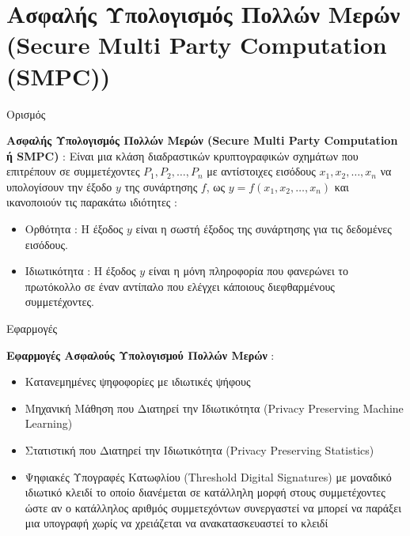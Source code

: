 \documentclass[10pt]{beamer}
\begin{document}
    \section{Ασφαλής Υπολογισμός Πολλών Μερών \\ (Secure Multi Party Computation (SMPC))}
    \begin{frame}{Ορισμός}
        \begin{block}{}
            \textbf{Ασφαλής Υπολογισμός Πολλών Μερών (Secure Multi Party Computation ή SMPC)} : Είναι μια κλάση διαδραστικών κρυπτογραφικών σχημάτων που επιτρέπουν σε συμμετέχοντες $P_1, P_2, \dots, P_n$ με αντίστοιχες εισόδους $x_1, x_2, \dots, x_n$ να υπολογίσουν την έξοδο $y$ της συνάρτησης $f$, ως $y = f(x_1, x_2, \dots, x_n)$ και ικανοποιούν τις παρακάτω ιδιότητες :
            \begin{itemize}
                \item Ορθότητα : Η έξοδος $y$ είναι η σωστή έξοδος της συνάρτησης για τις δεδομένες εισόδους.
                \item Ιδιωτικότητα : Η έξοδος $y$ είναι η μόνη πληροφορία που φανερώνει το πρωτόκολλο σε έναν αντίπαλο που ελέγχει κάποιους διεφθαρμένους συμμετέχοντες.
            \end{itemize}
        \end{block}
    \end{frame}

    \begin{frame}{Εφαρμογές}
        \begin{block}{}
            \textbf{Εφαρμογές Ασφαλούς Υπολογισμού Πολλών Μερών} :
            \begin{itemize}
                \item Κατανεμημένες ψηφοφορίες με ιδιωτικές ψήφους
                \item Μηχανική Μάθηση που Διατηρεί την Ιδιωτικότητα (Privacy Preserving Machine Learning)
                \item Στατιστική που Διατηρεί την Ιδιωτικότητα (Privacy Preserving Statistics)
                \item Ψηφιακές Υπογραφές Κατωφλίου (Threshold Digital Signatures) με μοναδικό ιδιωτικό κλειδί το οποίο διανέμεται σε κατάλληλη μορφή στους συμμετέχοντες ώστε αν ο κατάλληλος αριθμός συμμετεχόντων συνεργαστεί να μπορεί να παράξει μια υπογραφή χωρίς να χρειάζεται να ανακατασκευαστεί το κλειδί
            \end{itemize}
        \end{block}
    \end{frame}
\end{document}
